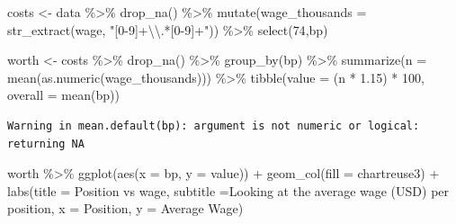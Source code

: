 \documentclass[
  letterpaper,
  DIV=11,
  numbers=noendperiod]{scrartcl}
\newenvironment{Shaded}{\begin{snugshade}}{\end{snugshade}}
\newcommand{\AttributeTok}[1]{\textcolor[rgb]{0.40,0.45,0.13}{#1}}
\newcommand{\DecValTok}[1]{\textcolor[rgb]{0.68,0.00,0.00}{#1}}
\newcommand{\FloatTok}[1]{\textcolor[rgb]{0.68,0.00,0.00}{#1}}
\newcommand{\FunctionTok}[1]{\textcolor[rgb]{0.28,0.35,0.67}{#1}}
\newcommand{\NormalTok}[1]{\textcolor[rgb]{0.00,0.23,0.31}{#1}}
\newcommand{\OtherTok}[1]{\textcolor[rgb]{0.00,0.23,0.31}{#1}}
\newcommand{\SpecialCharTok}[1]{\textcolor[rgb]{0.37,0.37,0.37}{#1}}
\newcommand{\StringTok}[1]{\textcolor[rgb]{0.13,0.47,0.30}{#1}}
\begin{document}
\begin{Shaded}
\begin{Highlighting}[]
\NormalTok{costs }\OtherTok{\textless{}{-}}\NormalTok{ data }\SpecialCharTok{\%\textgreater{}\%} 
  \FunctionTok{drop\_na}\NormalTok{() }\SpecialCharTok{\%\textgreater{}\%} 
  \FunctionTok{mutate}\NormalTok{(}\StringTok{\textquotesingle{}wage\_thousands\textquotesingle{}} \OtherTok{=} \FunctionTok{str\_extract}\NormalTok{(wage, }\StringTok{"[0{-}9]+}\SpecialCharTok{\textbackslash{}\textbackslash{}}\StringTok{.*[0{-}9]+"}\NormalTok{)) }\SpecialCharTok{\%\textgreater{}\%} 
  \FunctionTok{select}\NormalTok{(}\DecValTok{74}\NormalTok{,bp)}

\NormalTok{worth }\OtherTok{\textless{}{-}}\NormalTok{ costs }\SpecialCharTok{\%\textgreater{}\%} 
  \FunctionTok{drop\_na}\NormalTok{() }\SpecialCharTok{\%\textgreater{}\%}
  \FunctionTok{group\_by}\NormalTok{(bp) }\SpecialCharTok{\%\textgreater{}\%} 
  \FunctionTok{summarize}\NormalTok{(}\StringTok{\textquotesingle{}n\textquotesingle{}} \OtherTok{=} \FunctionTok{mean}\NormalTok{(}\FunctionTok{as.numeric}\NormalTok{(wage\_thousands))) }\SpecialCharTok{\%\textgreater{}\%} 
  \FunctionTok{tibble}\NormalTok{(}\AttributeTok{value =}\NormalTok{ (n }\SpecialCharTok{*} \FloatTok{1.15}\NormalTok{) }\SpecialCharTok{*} \DecValTok{100}\NormalTok{,}
          \AttributeTok{overall =} \FunctionTok{mean}\NormalTok{(bp))}
\end{Highlighting}
\end{Shaded}

\begin{verbatim}
Warning in mean.default(bp): argument is not numeric or logical: returning NA
\end{verbatim}

\begin{Shaded}
\begin{Highlighting}[]
\NormalTok{worth }\SpecialCharTok{\%\textgreater{}\%} \FunctionTok{ggplot}\NormalTok{(}\FunctionTok{aes}\NormalTok{(}\AttributeTok{x =}\NormalTok{ bp, }\AttributeTok{y =}\NormalTok{ value)) }\SpecialCharTok{+} 
  \FunctionTok{geom\_col}\NormalTok{(}\AttributeTok{fill =} \StringTok{\textquotesingle{}chartreuse3\textquotesingle{}}\NormalTok{) }\SpecialCharTok{+}
  \FunctionTok{labs}\NormalTok{(}\AttributeTok{title =} \StringTok{\textquotesingle{}Position vs wage\textquotesingle{}}\NormalTok{,}
       \AttributeTok{subtitle =}\StringTok{\textquotesingle{}Looking at the average wage (USD) per position\textquotesingle{}}\NormalTok{,}
       \AttributeTok{x =} \StringTok{\textquotesingle{}Position\textquotesingle{}}\NormalTok{,}
       \AttributeTok{y =} \StringTok{\textquotesingle{}Average Wage\textquotesingle{}}\NormalTok{)}
\end{Highlighting}
\end{Shaded}
\end{document}
